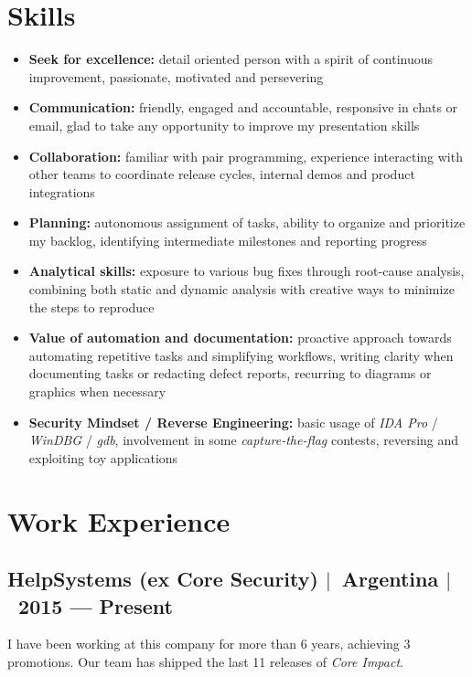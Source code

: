 \documentclass[12pt, a4paper]{article}
\newcommand{\mysep}{{\Large $\mid$}\ }
\newcommand{\titledItem}[2]{\item \textbf{#1:} #2}
\begin{document}
    \section*{Skills} \label{sec:skills}
    \begin{itemize}
        \titledItem{Seek for excellence}{%
            detail oriented person with a spirit of continuous improvement,
            passionate, motivated and persevering
        }
        \titledItem{Communication}{%
            friendly, engaged and accountable,
            responsive in chats or email,
            glad to take any opportunity to improve my presentation skills
        }
        \titledItem{Collaboration}{%
            familiar with pair programming,
            experience interacting with other teams to coordinate release cycles,
            internal demos and product integrations
        }
        \titledItem{Planning}{%
            autonomous assignment of tasks,
            ability to organize and prioritize my backlog,
            identifying intermediate milestones and reporting progress
        }
        \titledItem{Analytical skills}{%
            exposure to various bug fixes through root-cause analysis,
            combining both static and dynamic analysis with
            creative ways to minimize the steps to reproduce
        }
        \titledItem{Value of automation and documentation}{%
            proactive approach towards automating repetitive tasks and simplifying workflows,
            writing clarity when documenting tasks or redacting defect reports,
            recurring to diagrams or graphics when necessary
        }
        \titledItem{Security Mindset / Reverse Engineering}{%
            basic usage of \emph{IDA Pro} / \emph{WinDBG} / \emph{gdb},
            involvement in some \emph{capture-the-flag} contests,
            reversing and exploiting toy applications
        }
    \end{itemize}

    \section*{Work Experience} \label{sec:experience}

    \subsection*{HelpSystems (ex Core Security)  \mysep Argentina \mysep 2015 --- Present} \label{subsec:job1}
    I have been working at this company for more than 6 years, achieving 3 promotions.
    Our team has shipped the last 11 releases of \emph{Core Impact}.
\end{document}
